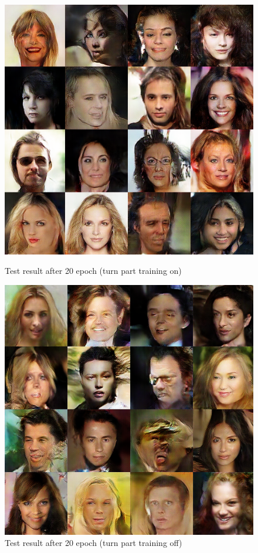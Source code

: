 \begin{figure}
    \begin{minipage}[t]{0.48\linewidth}
        \centering
        \includegraphics[width=\textwidth]{figures/result_part_on.png}
        \caption{Test result after 20 epoch (turn part training on)}
        \label{part_on}
    \end{minipage}
        \hfill
    \begin{minipage}[t]{0.48\linewidth}
        \centering
        \includegraphics[width=\textwidth]{figures/result_part_off.png}
        \caption{Test result after 20 epoch (turn part training off)}
        \label{part_off}
    \end{minipage}
\end{figure}

